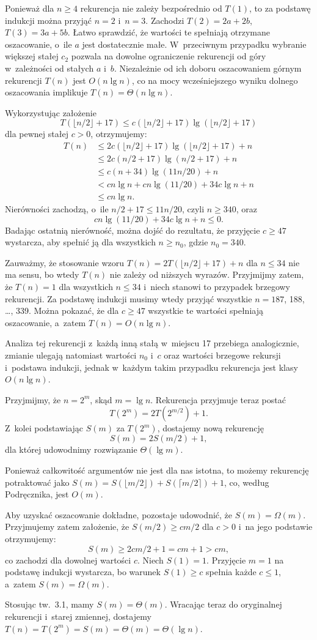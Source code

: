 Ponieważ dla $n\ge4$ rekurencja nie zależy bezpośrednio od $T(1)$, to za podstawę indukcji można przyjąć $n=2$ i~$n=3$.
Zachodzi $T(2)=2a+2b$, $T(3)=3a+5b$.
Łatwo sprawdzić, że wartości te spełniają otrzymane oszacowanie, o~ile $a$ jest dostatecznie małe.
W~przeciwnym przypadku wybranie większej stałej $c_2$ pozwala na dowolne ograniczenie rekurencji od góry w~zależności od stałych $a$ i~$b$.
Niezależnie od ich doboru oszacowaniem górnym rekurencji $T(n)$ jest $O(n\lg n)$, co na mocy wcześniejszego wyniku dolnego oszacowania implikuje $T(n)=\Theta(n\lg n)$.

\exercise %
Wykorzystując założenie
\[
	T(\lfloor n/2\rfloor+17) \le c(\lfloor n/2\rfloor+17)\lg(\lfloor n/2\rfloor+17)
\]
dla pewnej stałej $c>0$, otrzymujemy:
\begin{align*}
	T(n) &\le 2c(\lfloor n/2\rfloor+17)\lg(\lfloor n/2\rfloor+17)+n \\
	&\le 2c(n/2+17)\lg(n/2+17)+n \\
	&\le c(n+34)\lg(11n/20)+n \\
	&< cn\lg n+cn\lg(11/20)+34c\lg n+n \\
	&\le cn\lg n.
\end{align*}
Nierówności zachodzą, o~ile $n/2+17\le 11n/20$, czyli $n\ge340$, oraz
\[
	cn\lg(11/20)+34c\lg n+n \le 0.
\]
Badając ostatnią nierówność, można dojść do rezultatu, że przyjęcie $c\ge47$ wystarcza, aby spełnić ją dla wszystkich $n\ge n_0$, gdzie $n_0=340$.

Zauważmy, że stosowanie wzoru $T(n)=2T(\lfloor n/2\rfloor+17)+n$ dla $n\le34$ nie ma sensu, bo wtedy $T(n)$ nie zależy od niższych wyrazów.
Przyjmijmy zatem, że $T(n)=1$ dla wszystkich $n\le34$ i~niech stanowi to przypadek brzegowy rekurencji.
Za podstawę indukcji musimy wtedy przyjąć wszystkie $n=187$, 188, \dots, 339.
Można pokazać, że dla $c\ge47$ wszystkie te wartości spełniają oszacowanie, a~zatem $T(n)=O(n\lg n)$.

Analiza tej rekurencji z~każdą inną stałą w~miejscu 17 przebiega analogicznie, zmianie ulegają natomiast wartości $n_0$ i~$c$ oraz wartości brzegowe rekursji i~podstawa indukcji, jednak w~każdym takim przypadku rekurencja jest klasy $O(n\lg n)$.

\exercise %
Przyjmijmy, że $n=2^m$, skąd $m=\lg n$.
Rekurencja przyjmuje teraz postać
\[
	T(2^m) = 2T(2^{m/2})+1.
\]
Z~kolei podstawiając $S(m)$ za $T(2^m)$, dostajemy nową rekurencję
\[
	S(m) = 2S(m/2)+1,
\]
dla której udowodnimy rozwiązanie $\Theta(\lg m)$.

Ponieważ całkowitość argumentów nie jest dla nas istotna, to możemy rekurencję potraktować jako $S(m)=S(\lfloor m/2\rfloor)+S(\lceil m/2\rceil)+1$, co, według Podręcznika, jest $O(m)$.

Aby uzyskać oszacowanie dokładne, pozostaje udowodnić, że $S(m)=\Omega(m)$.
Przyjmujemy zatem założenie, że $S(m/2)\ge cm/2$ dla $c>0$ i~na jego podstawie otrzymujemy:
\[
	S(m) \ge 2cm/2+1 = cm+1 > cm,
\]
co zachodzi dla dowolnej wartości $c$.
Niech $S(1)=1$.
Przyjęcie $m=1$ na podstawę indukcji wystarcza, bo warunek $S(1)\ge c$ spełnia każde $c\le1$, a~zatem $S(m)=\Omega(m)$.

Stosując tw.\ 3.1, mamy $S(m)=\Theta(m)$.
Wracając teraz do oryginalnej rekurencji i~starej zmiennej, dostajemy $T(n)=T(2^m)=S(m)=\Theta(m)=\Theta(\lg n)$.
